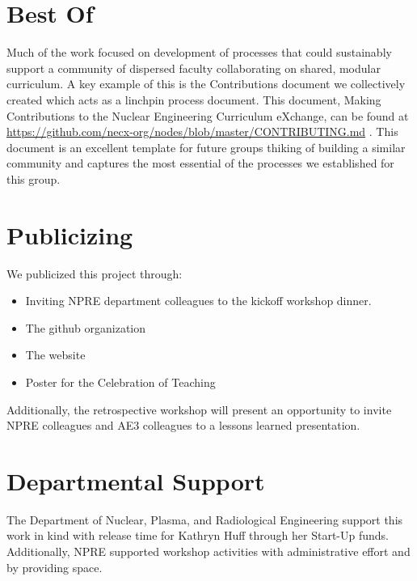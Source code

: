 \documentclass[11pt]{article}
\begin{document}
          \section{Best Of}
          Much of the work focused on development of processes that could 
          sustainably support a community of dispersed faculty collaborating on 
          shared, modular curriculum. A key example of this is the 
          Contributions document we collectively created which acts as a 
          linchpin process document. This document, Making Contributions to the Nuclear 
          Engineering Curriculum eXchange, can be found at 
          \url{https://github.com/necx-org/nodes/blob/master/CONTRIBUTING.md} . 
          This document is an excellent template for future groups thiking of 
          building a similar community and captures the most essential of the 
          processes we established for this group.

          \section{Publicizing}
          We publicized this project through:

          \begin{itemize}
                  \item Inviting NPRE department colleagues to the kickoff 
                          workshop dinner.
                  \item The github organization
                  \item The website
                  \item Poster for the Celebration of Teaching
          \end{itemize}
          Additionally, the retrospective workshop will present an opportunity 
          to invite NPRE colleagues and AE3 colleagues to a lessons learned 
          presentation.
          
          \section{Departmental Support}
          The Department of Nuclear, Plasma, and Radiological Engineering
          support this work in kind with release time for Kathryn Huff through 
          her Start-Up funds.  Additionally, NPRE supported workshop activities 
          with administrative effort and by providing space. 


          
          


          
\end{document}
